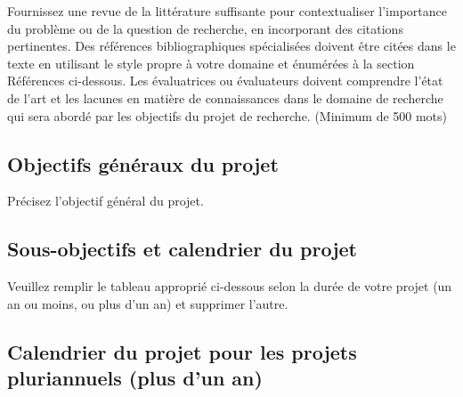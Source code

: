 \documentclass{mitacs-acceleration}
\begin{document}
\begin{instructions}
Fournissez une revue de la littérature suffisante pour contextualiser l'importance du problème ou de la question de recherche, en incorporant des citations pertinentes. Des références bibliographiques spécialisées doivent être citées dans le texte en utilisant le style propre à votre domaine et énumérées à la section \og{}Références\fg{} ci-dessous. Les évaluatrices ou évaluateurs doivent comprendre l'état de l'art et les lacunes en matière de connaissances dans le domaine de recherche qui sera abordé par les objectifs du projet de recherche. (Minimum de 500 mots)
\end{instructions}


\subsection{Objectifs généraux du projet}

\begin{instructions}
Précisez l'objectif général du projet.
\end{instructions}

\subsection{Sous-objectifs et calendrier du projet}

\begin{instructions}
Veuillez remplir le tableau approprié ci-dessous selon la durée de votre projet (un an ou moins, ou plus d'un an) et supprimer l'autre.
\end{instructions}

\tolandscape
\subsection*{Calendrier du projet pour les projets pluriannuels (plus d'un an)}
\end{document}
